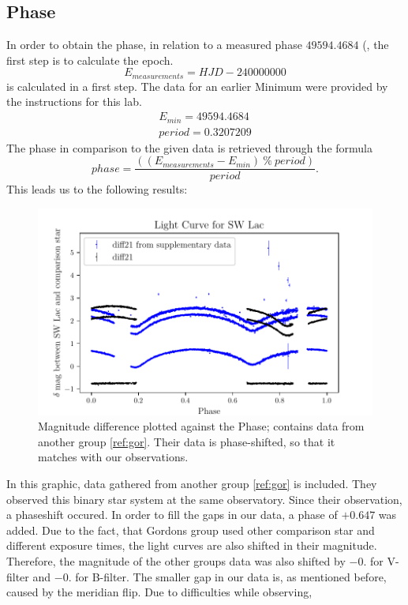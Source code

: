 \subsection{Phase}
  \label{sec:again}
  In order to obtain the phase, in relation to a measured phase $49594.4684$ (, the first step is to calculate the epoch.
  \begin{equation*}
    E_{measurements} = HJD - 240000000
  \end{equation*}
  is calculated in a first step. The data for an earlier Minimum were provided by the 
  instructions for this lab. 
  \begin{align*}
    E_{min} = 49594.4684\\
    period = 0.3207209
  \end{align*}
  The phase in comparison to the given data is retrieved through the formula
  \begin{equation}
    phase = \dfrac{((E_{measurements}-E_{min})\ \% \ period)}{period}.
  \end{equation}
  This leads us to the following results:
  \begin{figure}[H]
    \centering
    \includegraphics{gdPhase.pdf}
    \caption{Magnitude difference plotted against the Phase; contains data from another group
    \ref{ref:gor}. Their data is phase-shifted, so that it matches with our observations.}
    \label{fig:phase}
  \end{figure}
  In this graphic, data gathered from another group \ref{ref:gor} is included. 
  They observed this binary star system at the same observatory. Since their
  observation, a phaseshift occured. In order to fill the gaps in our data,
  a phase of $+0.647$ was added. Due to the fact, that Gordons group used other 
  comparison star and different exposure times, the light curves are also shifted in their
  magnitude. Therefore, the magnitude of the other groups data was also shifted
  by $-0.  $ for V-filter and $-0. $ for B-filter.
  The smaller gap in our data is, as mentioned before, caused by the meridian flip. 
  Due to difficulties while observing, 

